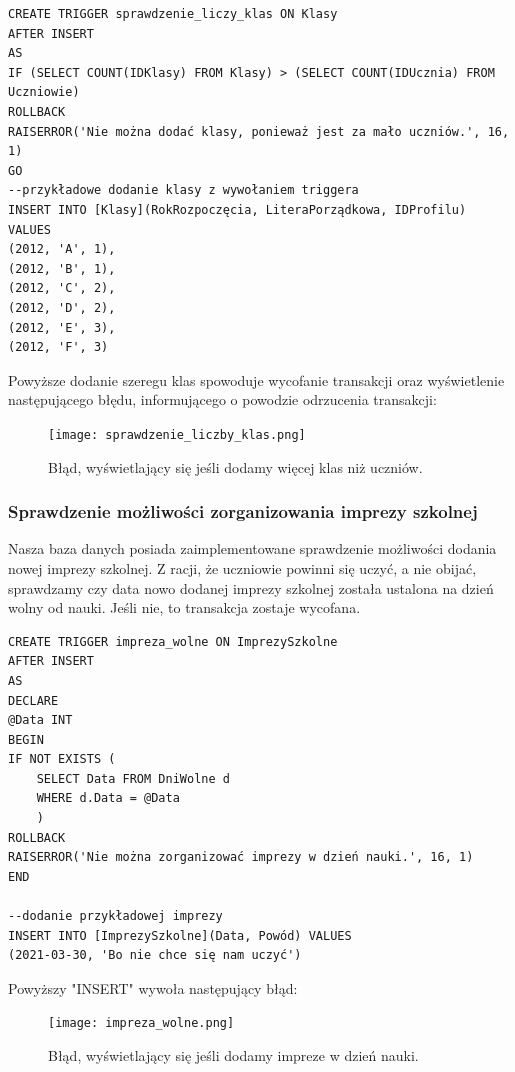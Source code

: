 \documentclass[60pt]{article}
\begin{document}
\begin{verbatim}
CREATE TRIGGER sprawdzenie_liczy_klas ON Klasy
AFTER INSERT
AS
IF (SELECT COUNT(IDKlasy) FROM Klasy) > (SELECT COUNT(IDUcznia) FROM Uczniowie)
ROLLBACK
RAISERROR('Nie można dodać klasy, ponieważ jest za mało uczniów.', 16, 1)
GO
--przykładowe dodanie klasy z wywołaniem triggera
INSERT INTO [Klasy](RokRozpoczęcia, LiteraPorządkowa, IDProfilu) VALUES
(2012, 'A', 1),
(2012, 'B', 1),
(2012, 'C', 2),
(2012, 'D', 2),
(2012, 'E', 3),
(2012, 'F', 3)
\end{verbatim}

Powyższe dodanie szeregu klas spowoduje wycofanie transakcji oraz wyświetlenie następującego błędu, informującego o powodzie odrzucenia transakcji:

\begin{figure}[h]
\begin{center}
  \texttt{[image: sprawdzenie\_liczby\_klas.png]}
  \caption{Błąd, wyświetlający się jeśli dodamy więcej klas niż uczniów.}
  \label{Błąd, wyświetlający się jeśli dodamy więcej klas niż uczniów.}
 \end{center}
\end{figure}

\subsubsection{Sprawdzenie możliwości zorganizowania imprezy szkolnej}

Nasza baza danych posiada zaimplementowane sprawdzenie możliwości dodania nowej imprezy szkolnej. Z racji, że uczniowie powinni się uczyć, a nie obijać, sprawdzamy czy data nowo dodanej imprezy szkolnej została ustalona na dzień wolny od nauki. Jeśli nie, to transakcja zostaje wycofana.

\begin{verbatim}
CREATE TRIGGER impreza_wolne ON ImprezySzkolne
AFTER INSERT
AS 
DECLARE
@Data INT
BEGIN
IF NOT EXISTS (
    SELECT Data FROM DniWolne d
    WHERE d.Data = @Data
    )
ROLLBACK
RAISERROR('Nie można zorganizować imprezy w dzień nauki.', 16, 1)
END

--dodanie przykładowej imprezy
INSERT INTO [ImprezySzkolne](Data, Powód) VALUES
(2021-03-30, 'Bo nie chce się nam uczyć')
\end{verbatim}

Powyższy "INSERT" wywoła następujący błąd:

\begin{figure}[h]
\begin{center}
  \texttt{[image: impreza\_wolne.png]}
  \caption{Błąd, wyświetlający się jeśli dodamy impreze w dzień nauki.}
  \label{Błąd, wyświetlający się jeśli dodamy impreze w dzień nauki.}
\end{center}
\end{figure}
\end{document}
